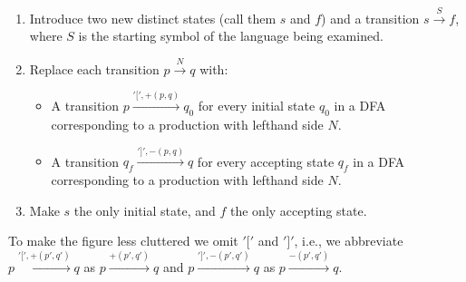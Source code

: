 \documentclass[runningheads]{llncs}
\newcommand{\pospl}{[}
\newcommand{\pospr}{]}
\begin{document}
\begin{enumerate}
\item Introduce two new distinct states (call them $s$ and $f$) and a transition $s \xrightarrow{S} f$, where $S$ is the starting symbol of the language being examined.
\item Replace each transition $p \xrightarrow{N} q$ with:
  \begin{itemize}
  \item A transition $p \xrightarrow{'\pospl', +(p,q)} q_0$ for every initial state $q_0$ in a DFA corresponding to a production with lefthand side $N$.
  \item A transition $q_f \xrightarrow{'\pospr', -(p,q)} q$ for every accepting state $q_f$ in a DFA corresponding to a production with lefthand side $N$.
  \end{itemize}
\item Make $s$ the only initial state, and $f$ the only accepting state.
\end{enumerate}

\noindent To make the figure less cluttered we omit $'\pospl'$ and $'\pospr'$, i.e., we abbreviate $p \xrightarrow{'\pospl', +(p',q')} q$ as $p \xrightarrow{+(p', q')} q$ and $p \xrightarrow{'\pospr', -(p',q')} q$ as $p \xrightarrow{-(p', q')} q$.
\end{document}

